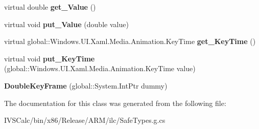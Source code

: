 \begin{DoxyCompactItemize}
virtual double {\bfseries get\+\_\+\+Value} ()
\item 
\mbox{\label{class_windows_1_1_u_i_1_1_xaml_1_1_media_1_1_animation_1_1_double_key_frame_ac8e9c608ef950cb4d594ab20df238c67}} 
virtual void {\bfseries put\+\_\+\+Value} (double value)
\item 
\mbox{\label{class_windows_1_1_u_i_1_1_xaml_1_1_media_1_1_animation_1_1_double_key_frame_aaa90bbff5cfbe24151ea9aa41a84bdc3}} 
virtual global\+::\+Windows.\+U\+I.\+Xaml.\+Media.\+Animation.\+Key\+Time {\bfseries get\+\_\+\+Key\+Time} ()
\item 
\mbox{\label{class_windows_1_1_u_i_1_1_xaml_1_1_media_1_1_animation_1_1_double_key_frame_a24618f65820c8ef09899ef7a3e13156f}} 
virtual void {\bfseries put\+\_\+\+Key\+Time} (global\+::\+Windows.\+U\+I.\+Xaml.\+Media.\+Animation.\+Key\+Time value)
\item 
\mbox{\label{class_windows_1_1_u_i_1_1_xaml_1_1_media_1_1_animation_1_1_double_key_frame_a901b2c0f622bb7b0e3f8f1c92ef2e678}} 
{\bfseries Double\+Key\+Frame} (global\+::\+System.\+Int\+Ptr dummy)
\end{DoxyCompactItemize}


The documentation for this class was generated from the following file\+:\begin{DoxyCompactItemize}
\item 
I\+V\+S\+Calc/bin/x86/\+Release/\+A\+R\+M/ilc/Safe\+Types.\+g.\+cs\end{DoxyCompactItemize}
